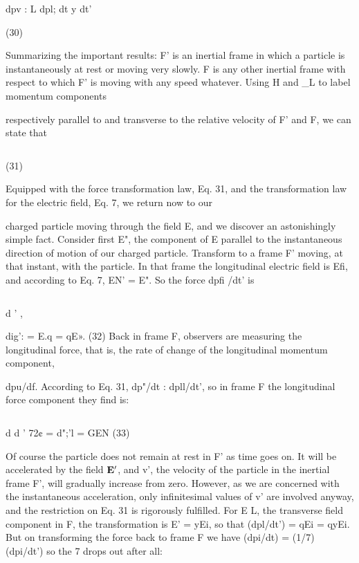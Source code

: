 dpv : L dpl;
dt y dt'

(30)

Summarizing the important results: F' is an inertial frame in
which a particle is instantaneously at rest or moving very slowly. F is
any other inertial frame with respect to which F' is moving with any
speed whatever. Using H and _L to label momentum components

respectively parallel to and transverse to the relative velocity of F'
and F, we can state that

\begin{equation}
\end{equation}

(31)

 

Equipped with the force transformation law, Eq. 31, and the transformation
law for the electric field, Eq. 7, we return now to our

charged particle moving through the field E, and we discover an
astonishingly simple fact. Consider first E", the component of E
parallel to the instantaneous direction of motion of our charged
particle. Transform to a frame F' moving, at that instant, with the
particle. In that frame the longitudinal electric field is Efi, and
according to Eq. 7, EN' = E". So the force dpfi /dt' is

\begin{equation}
\end{equation}

d ' ,

dig': = E.q = qE». (32)
Back in frame F, observers are measuring the longitudinal force, that
is, the rate of change of the longitudinal momentum component,

dpu/df. According to Eq. 31, dp"/dt : dpll/dt', so in frame F the
longitudinal force component they find is:

\begin{equation}
\end{equation}

d d '
72¢ = d";'l = GEN (33)

Of course the particle does not remain at rest in F' as time goes on.
It will be accelerated by the field $\mathbf{E}'$, and v', the velocity of the particle
in the inertial frame F', will gradually increase from zero. However,
as we are concerned with the instantaneous acceleration, only
infinitesimal values of v' are involved anyway, and the restriction
on Eq. 31 is rigorously fulfilled. For E L, the transverse field component
in F, the transformation is E' = yEi, so that (dpl/dt') =
qEi = qyEi. But on transforming the force back to frame F we have
(dpi/dt) = (1/7) (dpi/dt') so the 7 drops out after all:

